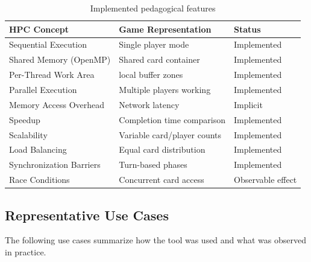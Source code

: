 \begin{table}[htbp]
    \centering
    \caption{Implemented pedagogical features}
    \label{tab:implemented-pedagogical}
    \begin{tabular}{@{}lll@{}}
        \toprule
        \textbf{HPC Concept}     & \textbf{Game Representation} & \textbf{Status}   \\
        \midrule
        Sequential Execution     & Single player mode           & Implemented       \\
        Shared Memory (OpenMP)   & Shared card container        & Implemented       \\
        Per-Thread Work Area     & local buffer zones           & Implemented       \\
        Parallel Execution       & Multiple players working     & Implemented       \\
        Memory Access Overhead   & Network latency              & Implicit          \\
        Speedup                  & Completion time comparison   & Implemented       \\
        Scalability              & Variable card/player counts  & Implemented       \\
        Load Balancing           & Equal card distribution      & Implemented       \\
        Synchronization Barriers & Turn-based phases            & Implemented       \\
        Race Conditions          & Concurrent card access       & Observable effect \\
        \bottomrule
    \end{tabular}
\end{table}


\subsection{Representative Use Cases}
\label{subsec:use-cases}

The following use cases summarize how the tool was used and what was observed in practice.

